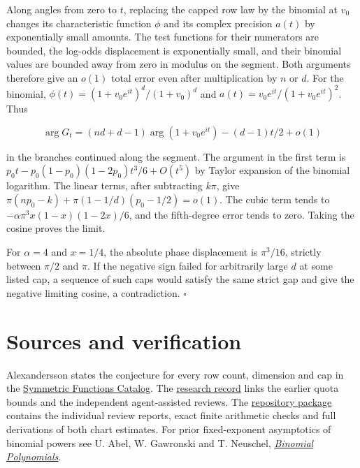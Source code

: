 \documentclass[11pt]{article}
\begin{document}
Along angles from zero to $t$, replacing the capped row law by the binomial at $v_0$ changes its characteristic function $\phi$ and its complex precision $a(t)$ by exponentially small amounts. The test functions for their numerators are bounded, the log-odds displacement is exponentially small, and their binomial values are bounded away from zero in modulus on the segment. Both arguments therefore give an $o(1)$ total error even after multiplication by $n$ or $d$. For the binomial, $\phi(t)=(1+v_0e^{it})^d/(1+v_0)^d$ and $a(t)=v_0e^{it}/(1+v_0e^{it})^2$. Thus

\[
\arg G_t=(nd+d-1)\arg(1+v_0 e^{it})-(d-1)t/2+o(1)
\]

in the branches continued along the segment. The argument in the first term is $p_0t-p_0(1-p_0)(1-2p_0)t^3/6+O(t^5)$ by Taylor expansion of the binomial logarithm. The linear terms, after subtracting $k\pi$, give $\pi(np_0-k)+\pi(1-1/d)(p_0-1/2)=o(1)$. The cubic term tends to $-\alpha\pi^3 x(1-x)(1-2x)/6$, and the fifth-degree error tends to zero. Taking the cosine proves the limit.

For $\alpha=4$ and $x=1/4$, the absolute phase displacement is $\pi^3/16$, strictly between $\pi/2$ and $\pi$. If the negative sign failed for arbitrarily large $d$ at some listed cap, a sequence of such caps would satisfy the same strict gap and give the negative limiting cosine, a contradiction. $\square$
\section*{Sources and verification}
Alexandersson states the conjecture for every row count, dimension and cap
in the \href{https://www.symmetricfunctions.com/realRootedOpenProblems.htm\#conjBalancedArrays}{Symmetric Functions Catalog}.
The \href{https://github.com/ProgramComputer/open-math-research/issues/2}{research record}
links the earlier quota bounds and the independent agent-assisted reviews.
The \href{https://github.com/ProgramComputer/open-math-research/tree/main/topics/balanced-arrays/effective-sublinear}{repository package}
contains the individual review reports, exact finite arithmetic checks and full derivations of both chart estimates.
For prior fixed-exponent asymptotics of binomial powers see U. Abel, W. Gawronski and T. Neuschel,
\href{https://doras.dcu.ie/31197/1/Binomialpolynomials.pdf}{\emph{Binomial Polynomials}}.
\end{document}
